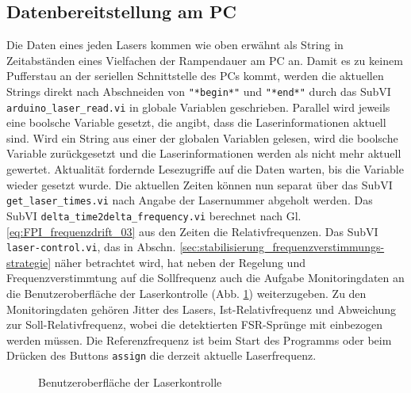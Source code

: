 \subsection{Datenbereitstellung am PC}\label{subsec:datenbereitstellung}
Die Daten eines jeden Lasers kommen wie oben erwähnt als String in Zeitabständen
eines Vielfachen der Rampendauer am PC an. Damit es zu keinem Pufferstau an
der seriellen Schnittstelle des PCs kommt, werden die aktuellen Strings direkt
nach Abschneiden von \lstinline|"*begin*"| und \lstinline|"*end*"| durch das
SubVI \lstinline|arduino_laser_read.vi| in globale Variablen geschrieben.
Parallel wird jeweils eine boolsche Variable gesetzt, die angibt, dass die Laserinformationen aktuell sind. Wird ein String aus einer der
globalen Variablen gelesen, wird die boolsche Variable zurückgesetzt und die
Laserinformationen werden als nicht mehr aktuell gewertet. Aktualität fordernde
Lesezugriffe auf die Daten warten, bis die Variable wieder gesetzt wurde. Die
aktuellen Zeiten können nun separat über das SubVI
\lstinline|get_laser_times.vi| nach Angabe der Lasernummer abgeholt werden. Das SubVI \lstinline|delta_time2delta_frequency.vi| berechnet nach Gl. \eqref{eq:FPI_frequenzdrift_03} aus den Zeiten die
Relativfrequenzen. Das SubVI \lstinline|laser-control.vi|, das in Abschn.
\ref{sec:stabilisierung_frequenzverstimmungs-strategie} näher betrachtet wird, hat neben der Regelung und Frequenzverstimmtung auf die Sollfrequenz auch die Aufgabe
Monitoringdaten an die Benutzeroberfläche der Laserkontrolle (Abb.
\ref{fig:benutzeroberflaeche_laserkontrolle}) weiterzugeben. Zu den
Monitoringdaten gehören Jitter des Lasers, Ist-Relativfrequenz und Abweichung
zur Soll-Relativfrequenz, wobei die detektierten FSR-Sprünge mit einbezogen
werden müssen. Die Referenzfrequenz ist beim Start des Programms oder beim
Drücken des Buttons \lstinline|assign| die derzeit aktuelle Laserfrequenz.
\begin{figure}[h]
 	\centering
	\caption[Benutzeroberfläche -
	Laserkontrolle]{Benutzeroberfläche
	der Laserkontrolle}\label{fig:benutzeroberflaeche_laserkontrolle}
\end{figure}

